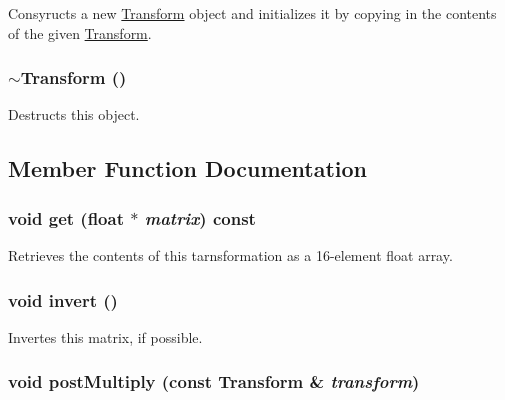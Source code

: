 Consyructs a new \hyperlink{classm3g_1_1Transform}{Transform} object and initializes it by copying in the contents of the given \hyperlink{classm3g_1_1Transform}{Transform}. \hypertarget{classm3g_1_1Transform_8e627263611a76aad02c9e0b89287c68}{
\subsubsection[{$\sim$Transform}]{\setlength{\rightskip}{0pt plus 5cm}$\sim${\bf Transform} ()}}
\label{classm3g_1_1Transform_8e627263611a76aad02c9e0b89287c68}


Destructs this object. 

\subsection{Member Function Documentation}
\hypertarget{classm3g_1_1Transform_f78faf7dcc06f53604ad08965babb7b3}{
\subsubsection[{get}]{\setlength{\rightskip}{0pt plus 5cm}void get (float $\ast$ {\em matrix}) const}}
\label{classm3g_1_1Transform_f78faf7dcc06f53604ad08965babb7b3}


Retrieves the contents of this tarnsformation as a 16-element float array. \hypertarget{classm3g_1_1Transform_7fa1616cc61c19a5efcc863c950f7f30}{
\subsubsection[{invert}]{\setlength{\rightskip}{0pt plus 5cm}void invert ()}}
\label{classm3g_1_1Transform_7fa1616cc61c19a5efcc863c950f7f30}


Invertes this matrix, if possible. \hypertarget{classm3g_1_1Transform_ad6083d90dbecc7e5bb39d5062723a0d}{
\subsubsection[{postMultiply}]{\setlength{\rightskip}{0pt plus 5cm}void postMultiply (const {\bf Transform} \& {\em transform})}}
\label{classm3g_1_1Transform_ad6083d90dbecc7e5bb39d5062723a0d}



